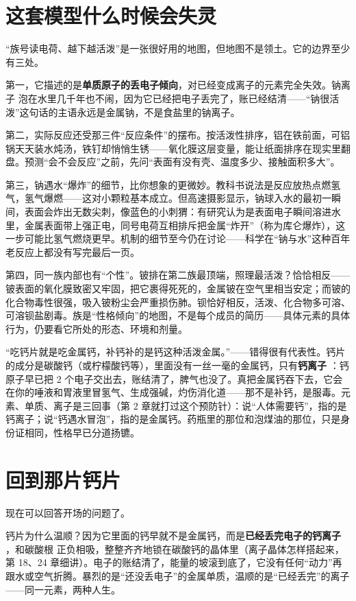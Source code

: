 \section{这套模型什么时候会失灵}

“族号读电荷、越下越活泼”是一张很好用的地图，但地图不是领土。它的边界至少有三处。

第一，它描述的是\textbf{单质原子的丢电子倾向}，对已经变成离子的元素完全失效。钠离子  泡在水里几千年也不闹，因为它已经把电子丢完了，账已经结清——“钠很活泼”这句话的主语永远是金属钠，不是食盐里的钠离子。

第二，实际反应还受那三件“反应条件”的摆布。按活泼性排序，铝在铁前面，可铝锅天天装水炖汤，铁钉却悄悄生锈——氧化膜这层变量，能让纸面排序在现实里翻盘。预测“会不会反应”之前，先问“表面有没有壳、温度多少、接触面积多大”。

第三，钠遇水“爆炸”的细节，比你想象的更微妙。教科书说法是反应放热点燃氢气，氢气爆燃——这对小颗粒基本成立。但高速摄影显示，钠球入水的最初一瞬间，表面会炸出无数尖刺，像蓝色的小刺猬：有研究认为是表面电子瞬间溶进水里，金属表面带上强正电，同号电荷互相排斥把金属“炸开”（称为库仑爆炸），这一步可能比氢气燃烧更早。机制的细节至今仍在讨论——科学在“钠与水”这种百年老反应上都没有写完最后一页。

第四，同一族内部也有“个性”。铍排在第二族最顶端，照理最活泼？恰恰相反——铍表面的氧化膜致密又牢固，把它裹得死死的，金属铍在空气里相当安定；而铍的化合物毒性很强，吸入铍粉尘会严重损伤肺。钡恰好相反，活泼、化合物多可溶、可溶钡盐剧毒。族是“性格倾向”的地图，不是每个成员的简历——具体元素的具体行为，仍要看它所处的形态、环境和剂量。

\begin{wuqu}
“吃钙片就是吃金属钙，补钙补的是钙这种活泼金属。”——错得很有代表性。钙片的成分是碳酸钙（或柠檬酸钙等），里面没有一丝一毫的金属钙，只有\textbf{钙离子} ：钙原子早已把 2 个电子交出去，账结清了，脾气也没了。真把金属钙吞下去，它会在你的唾液和胃液里冒氢气、生成强碱，灼伤消化道——那不是补钙，是服毒。元素、单质、离子是三回事（第 2 章就打过这个预防针）：说“人体需要钙”，指的是钙离子；说“钙遇水冒泡”，指的是金属钙。药瓶里的那位和泡煤油的那位，只是身份证相同，性格早已分道扬镳。
\end{wuqu}

\section{回到那片钙片}

现在可以回答开场的问题了。

钙片为什么温顺？因为它里面的钙早就不是金属钙，而是\textbf{已经丢完电子的钙离子} ，和碳酸根  正负相吸，整整齐齐地锁在碳酸钙的晶体里（离子晶体怎样搭起来，第 18、24 章细讲）。电子的账结清了，能量的坡滚到底了，它没有任何“动力”再跟水或空气折腾。暴烈的是“还没丢电子”的金属单质，温顺的是“已经丢完”的离子——同一元素，两种人生。

